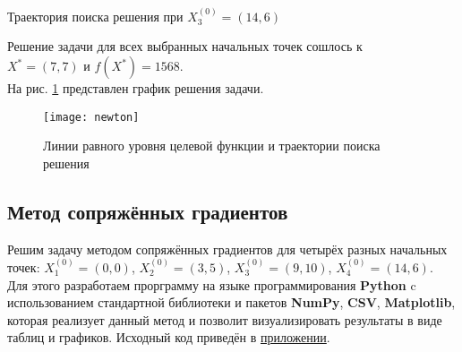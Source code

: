 \begin{table}[H]
\begin{center}
	\caption{Траектория поиска решения при $X_3^{(0)} = (14, 6)$}
	\label{tab:trajectory-newton-3}
	\def\tabcolsep{10pt}
	\def\arraystretch{1.23}
	\fontsize{13}{14}\selectfont
\end{center}
\end{table}

Решение задачи для всех выбранных начальных точек сошлось к\\ $X^* = (7, 7)$ и $f(X^*) = 1568$.\\

На рис. \ref{pic:newton} представлен график решения задачи.

\begin{figure}[H]
\begin{center}
	\texttt{[image: newton]}
	\caption{Линии равного уровня целевой функции и траектории поиска решения}
	\label{pic:newton}
\end{center}
\end{figure}

\subsection{Метод сопряжённых градиентов}

Решим задачу методом сопряжённых градиентов для четырёх разных начальных точек: $X_1^{(0)} = (0, 0)$, $X_2^{(0)} = (3, 5)$, $X_3^{(0)} = (9, 10)$, $X_4^{(0)} = (14, 6)$.\\

Для этого разработаем прорграмму на языке программирования \textbf{Python} c использованием стандартной библиотеки и пакетов \textbf{NumPy}, \textbf{CSV}, \textbf{Matplotlib}, которая реализует данный метод и позволит визуализировать результаты в виде таблиц и графиков.  Исходный код приведён в \hyperref[sec:application]{приложении}.\\

